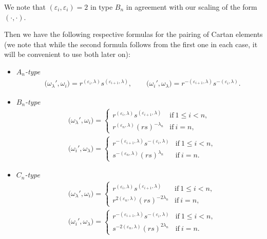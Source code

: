 \documentclass[10pt,a4paper]{amsart}
\numberwithin{equation}{section}
\begin{document}
\begin{Remark}
We note that $(\varepsilon_i,\varepsilon_i)=2$ in type $B_n$ in agreement with our scaling of the form~$(\cdot,\cdot)$.
\end{Remark}

Then we have the following respective formulas for the pairing of Cartan elements
(we note that while the second formula follows from the first one in each case, it will be convenient to use both later on):
\begin{itemize}\itemsep=0pt
\item
\emph{$A_{n}$-type}
\begin{align*}
 &\bigl(\omega_{\lambda}',\omega_{i}\bigr)= r^{( \varepsilon_{i},\lambda )}s^{( \varepsilon_{i +1},\lambda)}, \qquad
 \bigl(\omega_{i}',\omega_{\lambda}\bigr)= r^{-(\varepsilon_{i + 1},\lambda )}s^{-( \varepsilon_{i},\lambda)}.
\end{align*}

\item
\emph{$B_{n}$-type}
\begin{align}
 &\bigl(\omega_{\lambda}',\omega_{i}\bigr)=
 \begin{cases}
 r^{( \varepsilon_{i},\lambda )}s^{( \varepsilon_{i + 1},\lambda )}
 & \mathrm{if}\ 1\leq i<n ,\\
 r^{( \varepsilon_{n},\lambda ) }(rs)^{-\lambda_{n}}
 & \mathrm{if}\ i = n,
 \end{cases} \nonumber\\
 &\bigl(\omega_{i}',\omega_{\lambda}\bigr)=
 \begin{cases}
 r^{-( \varepsilon_{i + 1},\lambda)}s^{-( \varepsilon_{i},\lambda)}
 & \mathrm{if}\ 1\leq i<n ,\\
 s^{-( \varepsilon_{n},\lambda ) }(rs)^{\lambda_{n}}
 & \mathrm{if}\ i = n.
 \end{cases} \label{eq:B-pairing}
\end{align}

\item
\emph{$C_{n}$-type}
\begin{align}
 &\bigl(\omega_{\lambda}',\omega_{i}\bigr)=
 \begin{cases}
 r^{( \varepsilon_{i},\lambda) }s^{( \varepsilon_{i + 1},\lambda )}
 & \mathrm{if}\ 1\leq i<n ,\\
 r^{2( \varepsilon_{n},\lambda ) }(rs)^{-2\lambda_{n}}
 & \mathrm{if}\ i=n,
 \end{cases} \nonumber\\
 &\bigl(\omega_{i}',\omega_{\lambda}\bigr)=
 \begin{cases}
 r^{-( \varepsilon_{i + 1},\lambda )}s^{-( \varepsilon_{i},\lambda)}
 & \mathrm{if}\ 1\leq i<n, \\
 s^{-2( \varepsilon_{n},\lambda )}(rs)^{2\lambda_{n}}
 & \mathrm{if}\ i = n.
 \end{cases} \label{eq:C-pairing}
\end{align}


\end{itemize}
\end{document}

